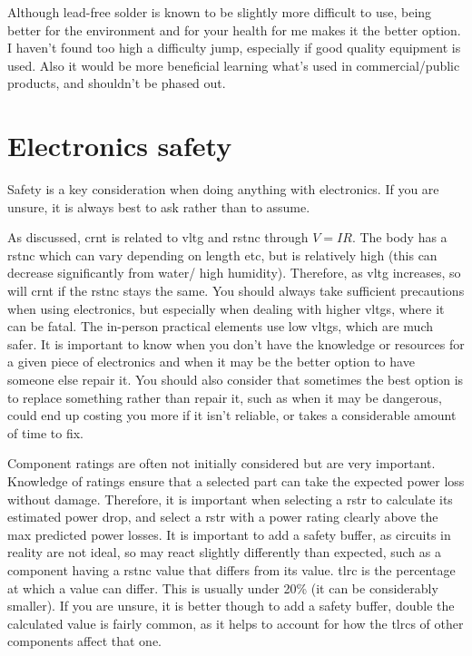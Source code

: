 \documentclass[a4paper,11pt]{report}
\begin{document}
Although lead-free solder is known to be slightly more difficult to use, being better for the environment and for your health for me makes it the better option. I haven't found too high a difficulty jump, especially if good quality equipment is used. Also it would be more beneficial learning what's used in commercial/public products, and shouldn't be phased out.

\pagebreak

\section{Electronics safety}

Safety is a key consideration when doing anything with electronics. If you are unsure, it is always best to ask rather than to assume.

As discussed, \gls{crnt} is related to \gls{vltg} and \gls{rstnc} through $V=IR$. The body has a \gls{rstnc} which can vary depending on length etc, but is relatively high (this can decrease significantly from water/ high humidity). Therefore, as \gls{vltg} increases, so will \gls{crnt} if the \gls{rstnc} stays the same. You should always take sufficient precautions when using electronics, but especially when dealing with higher \gls{vltg}s, where it can be fatal. The in-person practical elements use low \gls{vltg}s, which are much safer. It is important to know when you don't have the knowledge or resources for a given piece of electronics and when it may be the better option to have someone else repair it. You should also consider that sometimes the best option is to replace something rather than repair it, such as when it may be dangerous, could end up costing you more if it isn't reliable, or takes a considerable amount of time to fix.

Component ratings are often not initially considered but are very important. Knowledge of ratings ensure that a selected part can take the expected power loss without damage. Therefore, it is important when selecting a \gls{rstr} to calculate its estimated power drop, and select a \gls{rstr} with a power rating clearly above the max predicted power losses. It is important to add a safety buffer, as circuits in reality are not ideal, so may react slightly differently than expected, such as a component having a \gls{rstnc} value that differs from its value.
\gls{tlrc} is the percentage at which a value can differ. This is usually under 20\% (it can be considerably smaller). If you are unsure, it is better though to add a safety buffer, double the calculated value is fairly common, as it helps to account for how the \gls{tlrc}s of other components affect that one.
\end{document}
